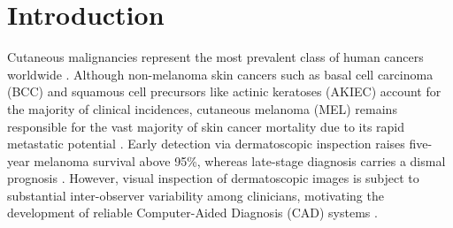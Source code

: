 \documentclass[11pt,a4paper]{article}
\begin{document}
\begin{abstract}
\noindent\textbf{Conclusions:} Within the evaluated lesion-grouped protocol, hybrid transfer learning with EfficientNetV2B0 significantly outperforms classical feature-engineered ensembles ($p < 0.0001$, McNemar and paired cluster bootstrap tests) while maintaining low computational overhead ($5.9 \times 10^6$ backbone parameters). Clinical error auditing of melanoma false negatives, Grad-CAM visual explanations, and photometric perturbation tests underscore both the screening potential of threshold calibration and the need for external multi-center validation prior to clinical deployment.

\vspace{0.6em}
\noindent\textbf{Keywords:} Skin Cancer Classification; HAM10000; Dermoscopy; EfficientNetV2B0; Multimodal Deep Learning; ABCD Rule; Threshold Calibration; Data Leakage Prevention.
\end{abstract}

\section{Introduction}
Cutaneous malignancies represent the most prevalent class of human cancers worldwide \cite{sung2021, siegel2024}. Although non-melanoma skin cancers such as basal cell carcinoma (BCC) and squamous cell precursors like actinic keratoses (AKIEC) account for the majority of clinical incidences, cutaneous melanoma (MEL) remains responsible for the vast majority of skin cancer mortality due to its rapid metastatic potential \cite{rigel2010}. Early detection via dermatoscopic inspection raises five-year melanoma survival above 95\%, whereas late-stage diagnosis carries a dismal prognosis \cite{ Kittler2002, tschandl2018}. However, visual inspection of dermatoscopic images is subject to substantial inter-observer variability among clinicians, motivating the development of reliable Computer-Aided Diagnosis (CAD) systems \cite{esteva2017, haenssle2018}.
\end{document}
